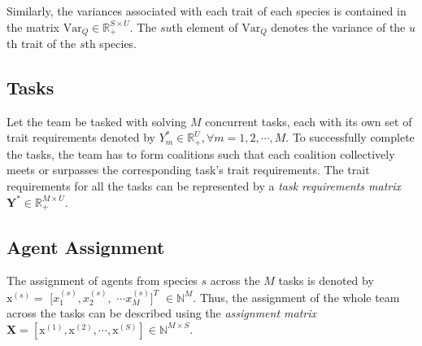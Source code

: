 \documentclass[letterpaper, 10 pt, conference]{ieeeconf}  %
\begin{document}
Similarly, the variances associated with each trait of each species is contained in the matrix $\bm{\mathrm{Var}}_Q \in \mathbb{R}^{S \times U}_{+}$. The $su$th element of $\bm{\mathrm{Var}}_Q$ denotes the variance of the $u$th trait of the $s$th species. 

\subsection{Tasks}

Let the team be tasked with solving $M$ concurrent tasks, each with its own set of trait requirements denoted by $Y^*_m \in \mathbb{R}_+^U, \forall m=1,2,\cdots,M$. To successfully complete the tasks, the team has to form coalitions such that each coalition collectively meets or surpasses the corresponding task's trait requirements. The trait requirements for all the tasks can be represented by a \emph{task requirements matrix} $\bm{Y}^* \in \mathbb{R}_+^{M \times U}$.

\subsection{Agent Assignment}

The assignment of agents from species $s$ across the $M$ tasks is denoted by $\mathrm{x}^{(s)} =$ $[x^{(s)}_{1}, x^{(s)}_{2},$ $\cdots x^{(s)}_{M}]^T$ $\in \mathbb{N}^M$. Thus, the assignment of the whole team across the tasks can be described using the \emph{assignment matrix} $\bm{X} = [\mathrm{x}^{(1)}, \mathrm{x}^{(2)}, \cdots, \mathrm{x}^{(S)}] \in \mathbb{N}^{M \times S}$. 
\end{document}
